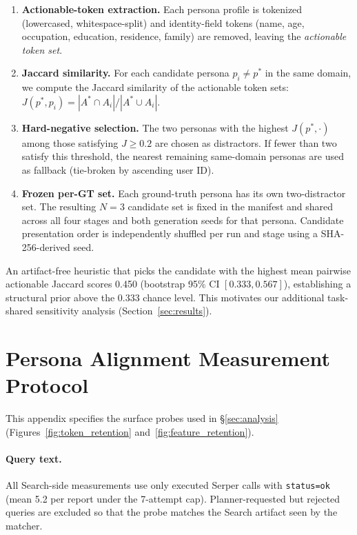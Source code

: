 \documentclass[]{article}
\begin{document}
\begin{enumerate}
\item \textbf{Actionable-token extraction.} Each persona profile is
  tokenized (lowercased, whitespace-split) and identity-field tokens
  (name, age, occupation, education, residence, family) are removed,
  leaving the \emph{actionable token set}.
\item \textbf{Jaccard similarity.} For each candidate persona $p_i \neq
  p^*$ in the same domain, we compute the Jaccard similarity of the
  actionable token sets: $J(p^*, p_i) = |A^* \cap A_i| / |A^* \cup A_i|$.
\item \textbf{Hard-negative selection.} The two personas with the highest
  $J(p^*, \cdot)$ among those satisfying $J \geq 0.2$ are chosen as
  distractors. If fewer than two satisfy this threshold, the nearest
  remaining same-domain personas are used as fallback (tie-broken by
  ascending user ID).
\item \textbf{Frozen per-GT set.} Each ground-truth persona has its own
  two-distractor set. The resulting $N=3$ candidate set is fixed in the
  manifest and shared across all four stages and both generation seeds
  for that persona. Candidate presentation order is independently
  shuffled per run and stage using a SHA-256-derived seed.
\end{enumerate}

An artifact-free heuristic that picks the candidate with the highest mean
pairwise actionable Jaccard scores 0.450 (bootstrap 95\% CI
$[0.333, 0.567]$), establishing a structural prior above the 0.333 chance
level. This motivates our additional task-shared sensitivity analysis
(Section~\ref{sec:results}).

\section{Persona Alignment Measurement Protocol}
\label{app:retention_protocol}

This appendix specifies the surface probes used in
\S\ref{sec:analysis} (Figures~\ref{fig:token_retention}
and~\ref{fig:feature_retention}).

\paragraph{Query text.}
All Search-side measurements use only executed Serper calls with
\texttt{status=ok} (mean 5.2 per report under the 7-attempt cap).
Planner-requested but rejected queries are excluded so that the probe
matches the Search artifact seen by the matcher.
\end{document}
